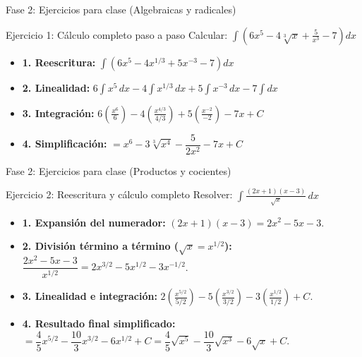 \documentclass[aspectratio=169,11pt]{beamer}
\begin{document}
\begin{frame}{Fase 2: Ejercicios para clase (Algebraicas y radicales)}
\small
\begin{block}{Ejercicio 1: Cálculo completo paso a paso}
Calcular: \quad $\displaystyle\int \left( 6x^5 - 4\sqrt[3]{x} + \frac{5}{x^3} - 7 \right) dx$
\end{block}
\vspace{0.06cm}
\begin{techbox}[title=Resolución detallada]
\footnotesize
\begin{itemize}[itemsep=2pt]
  \item \textbf{1. Reescritura:} $\displaystyle\int \left( 6x^5 - 4x^{1/3} + 5x^{-3} - 7 \right) dx$
  \item \textbf{2. Linealidad:} $6\displaystyle\int x^5\,dx - 4\int x^{1/3}\,dx + 5\int x^{-3}\,dx - 7\int dx$
  \item \textbf{3. Integración:} $6\left(\frac{x^6}{6}\right) - 4\left(\frac{x^{4/3}}{4/3}\right) + 5\left(\frac{x^{-2}}{-2}\right) - 7x + C$
  \item \textbf{4. Simplificación:} $= x^6 - 3\sqrt[3]{x^4} - \dfrac{5}{2x^2} - 7x + C$
\end{itemize}
\end{techbox}
\end{frame}

\begin{frame}{Fase 2: Ejercicios para clase (Productos y cocientes)}
\small
\begin{block}{Ejercicio 2: Reescritura y cálculo completo}
Resolver: \quad $\displaystyle\int \frac{(2x+1)(x-3)}{\sqrt{x}}\,dx$
\end{block}
\vspace{0.06cm}
\begin{techbox}[title=Resolución paso a paso]
\footnotesize
\begin{itemize}[itemsep=2pt]
  \item \textbf{1. Expansión del numerador:} $(2x+1)(x-3) = 2x^2 - 5x - 3$.
  \item \textbf{2. División término a término ($\sqrt{x}=x^{1/2}$):}
  $\dfrac{2x^2 - 5x - 3}{x^{1/2}} = 2x^{3/2} - 5x^{1/2} - 3x^{-1/2}$.
  \item \textbf{3. Linealidad e integración:}
  $2\left( \frac{x^{5/2}}{5/2} \right) - 5\left( \frac{x^{3/2}}{3/2} \right) - 3\left( \frac{x^{1/2}}{1/2} \right) + C$.
  \item \textbf{4. Resultado final simplificado:}
  $= \dfrac{4}{5}x^{5/2} - \dfrac{10}{3}x^{3/2} - 6x^{1/2} + C = \dfrac{4}{5}\sqrt{x^5} - \dfrac{10}{3}\sqrt{x^3} - 6\sqrt{x} + C$.
\end{itemize}
\end{techbox}
\end{frame}
\end{document}
